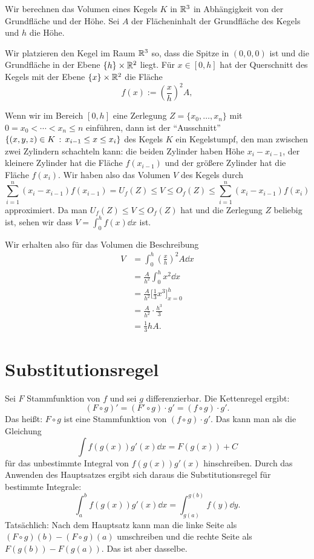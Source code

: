 \begin{bsp}
	Wir berechnen das Volumen eines Kegels $K$ in $\mathbb{R}^3$ in Abhängigkeit von der Grundfläche und der Höhe. Sei $A$ der Flächeninhalt der Grundfläche des Kegels und $h$ die Höhe. 
	
	Wir platzieren den Kegel im Raum $\mathbb{R}^3$ so, dass die Spitze in $(0,0,0)$ ist und die Grundfläche in der Ebene $\{h\} \times \mathbb{R}^2$ liegt. Für $x \in [0,h]$ hat der Querschnitt des Kegels mit der Ebene $\{x\} \times \mathbb{R}^2$ die Fläche 
	\[
		f(x) := \left( \frac{x}{h} \right)^2 A,
	\]
	
	Wenn wir im Bereich $[0,h]$ eine Zerlegung $Z = \{x_0,\ldots,x_n\}$ mit $0=x_0 < \cdots < x_n \le n$ einführen, dann ist der ``Ausschnitt'' $\left\{  (x,y,z) \in K \,:\,  x_{i-1} \le x \le x_i \right\}$ des Kegels $K$ ein Kegelstumpf, den man zwischen zwei Zylindern schachteln kann:  die beiden Zylinder haben Höhe $x_i - x_{i-1}$, der kleinere Zylinder hat die Fläche $f(x_{i-1})$ und der größere Zylinder hat die Fläche $f(x_i)$. Wir haben also das Volumen $V$ des Kegels durch 
	\[
	 \sum_{i=1}^n (x_i - x_{i-1}) f(x_{i-1}) = U_f(Z) \le V \le O_f(Z) \le \sum_{i=1}^n (x_i-x_{i-1}) f(x_i)
	\] approximiert. Da man $U_f(Z) \le V \le O_f(Z)$ hat und die Zerlegung $Z$ beliebig ist, sehen wir dass  $V = \int_0^h f(x) \dd x$ ist. 
	
	
 Wir erhalten also für das Volumen die Beschreibung
	\begin{align*}
		V & = \int_0^h \left( \frac{x}{h} \right)^2 A \dd x
		\\ & = \frac{A}{h^2} \int_0^h x^2 \dd x
		\\ & = \frac{A}{h^2} \biggl[ \frac{1}{3} x^3 \biggr]_{x=0}^h
		\\ & = \frac{A}{h^2} \cdot \frac{h^3}{3} 
		\\ & = \frac{1}{3} h A. 
	\end{align*}
\end{bsp} 


\section{Substitutionsregel} 

\begin{bem}[Substitution]
	
	Sei $F$ Stammfunktion von $f$ und sei $g$ differenzierbar. Die Kettenregel ergibt: 
	\[
		(F \circ g)' = (F' \circ g) \cdot g' = (f \circ g) \cdot g'. 
	\]
	Das heißt: $F \circ g$ ist eine Stammfunktion von $(f \circ g) \cdot g'$. Das kann man als die Gleichung 
	\[
		\int f ( g(x)) g'(x) \dd x = F(g(x)) + C
	\]
	für das unbestimmte Integral von $f (g(x)) g'(x)$ 
	hinschreiben. Durch das Anwenden des Hauptsatzes ergibt sich daraus die Substitutionsregel für bestimmte Integrale: 
	\[
		\int_a^b f(g(x)) g'(x) \dd x = \int_{g(a)}^{g(b)} f(y) \dd y. 
	\]
	Tatsächlich: Nach dem Hauptsatz kann man die linke Seite als $(F \circ g)(b) - (F \circ g)(a)$ umschreiben und die rechte Seite als $F(g(b)) - F(g(a))$. Das ist aber dasselbe. 
\end{bem} 

